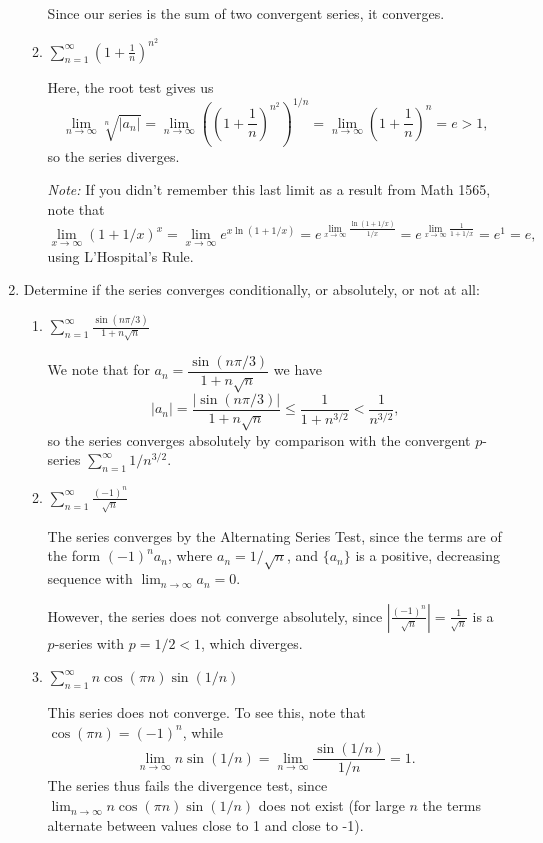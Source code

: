 \documentclass[12pt]{article}
\newcommand{\di}{\displaystyle}
\newcommand{\abs}[1]{\left\lvert #1\right\rvert}
\begin{document}
\begin{enumerate}
\begin{enumerate}
Since our series is the sum of two convergent series, it converges.

\item $\di\sum_{n=1}^\infty\left(1+\frac{1}{n}\right)^{n^2}$

Here, the root test gives us
\[
\lim_{n\to\infty}\sqrt[n]{\abs{a_n}} =\lim_{n\to \infty} \left(\left(1+\frac1n\right)^{n^2}\right)^{1/n} = \lim_{n\to \infty}\left(1+\frac{1}{n}\right)^n = e>1,
\]
so the series diverges.

\textit{Note:} If you didn't remember this last limit as a result from Math 1565, note that
\[
\lim_{x\to \infty}(1+1/x)^x=\lim_{x\to\infty}e^{x\ln(1+1/x)}= e^{\lim_{x\to\infty}\frac{\ln(1+1/x)}{1/x}} = e^{\lim_{x\to\infty}\frac{1}{1+1/x}}=e^1=e,
\]
using L'Hospital's Rule.
\end{enumerate}

\item Determine if the series converges conditionally, or absolutely, or not at all:
\begin{enumerate}
\item $\di\sum_{n=1}^\infty\frac{\sin(n\pi/3)}{1+n\sqrt{n}}$

We note that for $a_n = \dfrac{\sin(n\pi/3)}{1+n\sqrt{n}}$ we have
\[
\abs{a_n} = \frac{\abs{\sin(n\pi/3)}}{1+n\sqrt{n}}\leq \frac{1}{1+n^{3/2}}<\frac{1}{n^{3/2}},
\]
so the series converges absolutely by comparison with the convergent $p$-series $\sum_{n=1}^\infty 1/n^{3/2}$.

\item $\di\sum_{n=1}^\infty\frac{(-1)^n}{\sqrt{n}}$

The series converges by the Alternating Series Test, since the terms are of the form $(-1)^na_n$, where $a_n=1/\sqrt{n}$, and $\{a_n\}$ is a positive, decreasing sequence with $\lim_{n\to\infty}a_n=0$.

However, the series does not converge absolutely, since $\di\abs{\frac{(-1)^n}{\sqrt{n}}}=\frac{1}{\sqrt{n}}$ is a $p$-series with $p=1/2<1$, which diverges.

\item $\di\sum_{n=1}^\infty n\cos(\pi n)\sin(1/n)$

This series does not converge. To see this, note that $\cos(\pi n)=(-1)^n$, while
\[
\lim_{n\to\infty}n\sin(1/n)=\lim_{n\to\infty}\frac{\sin(1/n)}{1/n}=1.
\]
The series thus fails the divergence test, since $\lim_{n\to\infty}n\cos(\pi n)\sin(1/n)$ does not exist (for large $n$ the terms alternate between values close to 1 and close to -1).
\end{enumerate}



\end{enumerate}
\end{document}
